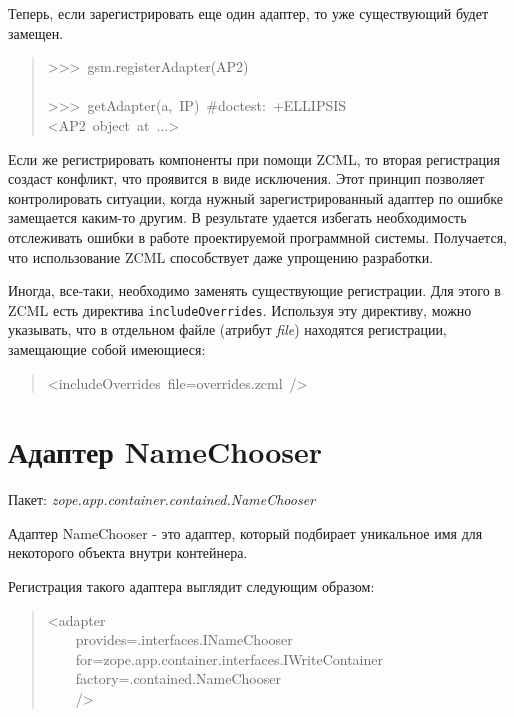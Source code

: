 \documentclass[14pt,a4paper,openany,twoside,final]{extbook}
\providecommand*{\DUroletitlereference}[1]{\textsl{#1}}
\begin{document}
Теперь, если зарегистрировать еще один адаптер, то уже существующий
будет замещен.

\begin{quote}{\ttfamily \raggedright \noindent
>{}>{}>~gsm.registerAdapter(AP2)\\
~\\
>{}>{}>~getAdapter(a,~IP)~\#doctest:~+ELLIPSIS\\
<AP2~object~at~...>
}
\end{quote}

Если же регистрировать компоненты при помощи ZCML, то вторая
регистрация создаст конфликт, что проявится в виде исключения.  Этот
принцип позволяет контролировать ситуации, когда нужный
зарегистрированный адаптер по ошибке замещается каким-то другим.  В
результате удается избегать необходимость отслеживать ошибки в работе
проектируемой программной системы.  Получается, что использование ZCML
способствует даже упрощению разработки.

Иногда, все-таки, необходимо заменять существующие регистрации.  Для
этого в ZCML есть директива \texttt{includeOverrides}.  Используя эту
директиву, можно указывать, что в отдельном файле (атрибут \DUroletitlereference{file})
находятся регистрации, замещающие собой имеющиеся:

\begin{quote}{\ttfamily \raggedright \noindent
<includeOverrides~file=\textquotedbl{}overrides.zcml\textquotedbl{}~/>
}
\end{quote}


\section{Адаптер NameChooser%
  \label{namechooser}%
}

Пакет: \DUroletitlereference{zope.app.container.contained.NameChooser}

Адаптер NameChooser - это адаптер, который подбирает уникальное имя
для некоторого объекта внутри контейнера.

Регистрация такого адаптера выглядит следующим образом:

\begin{quote}{\ttfamily \raggedright \noindent
<adapter\\
~~~~provides=\textquotedbl{}.interfaces.INameChooser\textquotedbl{}\\
~~~~for=\textquotedbl{}zope.app.container.interfaces.IWriteContainer\textquotedbl{}\\
~~~~factory=\textquotedbl{}.contained.NameChooser\textquotedbl{}\\
~~~~/>
}
\end{quote}
\end{document}
